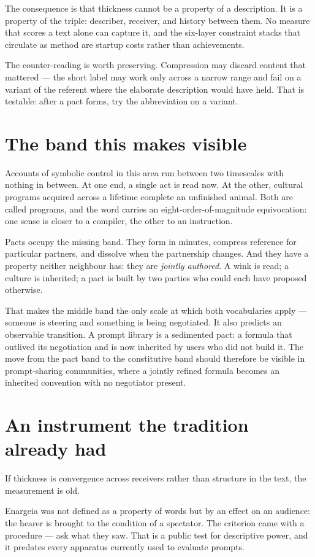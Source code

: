 \documentclass[11pt,a4paper]{article}
\begin{document}
The consequence is that thickness cannot be a property of a description. It is a property of the triple: describer, receiver, and history between them. No measure that scores a text alone can capture it, and the six-layer constraint stacks that circulate as method are startup costs rather than achievements.

The counter-reading is worth preserving. Compression may discard content that mattered --- the short label may work only across a narrow range and fail on a variant of the referent where the elaborate description would have held. That is testable: after a pact forms, try the abbreviation on a variant.

\section{The band this makes visible}
Accounts of symbolic control in this area run between two timescales with nothing in between. At one end, a single act is read now. At the other, cultural programs acquired across a lifetime complete an unfinished animal. Both are called programs, and the word carries an eight-order-of-magnitude equivocation: one sense is closer to a compiler, the other to an instruction.

Pacts occupy the missing band. They form in minutes, compress reference for particular partners, and dissolve when the partnership changes. And they have a property neither neighbour has: they are \emph{jointly authored}. A wink is read; a culture is inherited; a pact is built by two parties who could each have proposed otherwise.

That makes the middle band the only scale at which both vocabularies apply --- someone is steering and something is being negotiated. It also predicts an observable transition. A prompt library is a sedimented pact: a formula that outlived its negotiation and is now inherited by users who did not build it. The move from the pact band to the constitutive band should therefore be visible in prompt-sharing communities, where a jointly refined formula becomes an inherited convention with no negotiator present.

\section{An instrument the tradition already had}
If thickness is convergence across receivers rather than structure in the text, the measurement is old.

Enargeia was not defined as a property of words but by an effect on an audience: the hearer is brought to the condition of a spectator. The criterion came with a procedure --- ask what they saw. That is a public test for descriptive power, and it predates every apparatus currently used to evaluate prompts.
\end{document}
